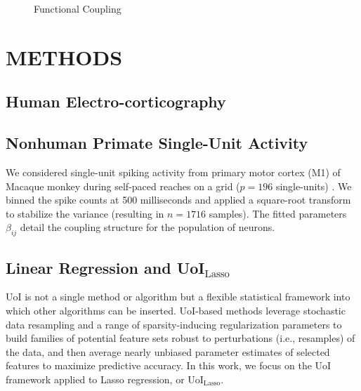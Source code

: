 \documentclass[letterpaper, 10 pt, conference]{ieeeconf}  %
\begin{document}
\begin{figure}[t!]
    \vspace{-15pt}
    \centering
    \vspace{-20pt}
    \caption{Functional Coupling}
    \label{fig:intro}
\end{figure}

\section{METHODS}
\subsection{Human Electro-corticography}

\subsection{Nonhuman Primate Single-Unit Activity}
We considered single-unit spiking activity from primary motor cortex (M1) of Macaque monkey during self-paced reaches on a grid ($p=196$ single-units) \cite{nhp}. We binned the spike counts at 500 milliseconds and applied a square-root transform to stabilize the variance (resulting in $n=1716$ samples). The fitted parameters $\beta_{ij}$ detail the coupling structure for the population of neurons.

\subsection{Linear Regression and UoI$_{\text{Lasso}}$}
UoI is not a single method or algorithm but a flexible statistical framework into which other algorithms can be inserted. UoI-based methods leverage stochastic data resampling and a range of sparsity-inducing regularization parameters to build families of potential feature sets robust to perturbations (i.e., resamples) of the data, and then average nearly unbiased parameter estimates of selected features to maximize predictive accuracy. In this work, we focus on the UoI framework applied to Lasso regression, or UoI$_{\text{Lasso}}$.
\end{document}
